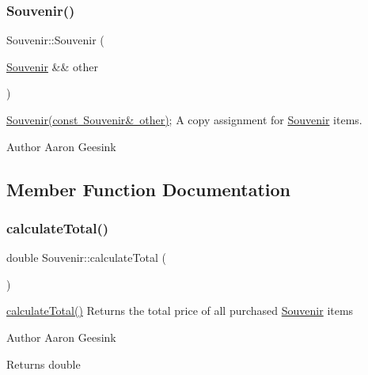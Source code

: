 \subsubsection{\texorpdfstring{Souvenir()}{Souvenir()}\hspace{0.1cm}{\footnotesize\ttfamily [4/4]}}
{\footnotesize\ttfamily Souvenir\+::\+Souvenir (\begin{DoxyParamCaption}\item[{\mbox{\hyperlink{class_souvenir}{Souvenir}} \&\&}]{other }\end{DoxyParamCaption})}



\mbox{\hyperlink{class_souvenir_a358e41f53d1806aa00b8b1f2f31f4e11}{Souvenir(const Souvenir\& other)}}; A copy assignment for \mbox{\hyperlink{class_souvenir}{Souvenir}} items. 

\begin{DoxyAuthor}{Author}
Aaron Geesink 
\end{DoxyAuthor}


\subsection{Member Function Documentation}
\mbox{\label{class_souvenir_a4ee8f8262e9020e6141c4d228450b03d}} 
\subsubsection{\texorpdfstring{calculateTotal()}{calculateTotal()}}
{\footnotesize\ttfamily double Souvenir\+::calculate\+Total (\begin{DoxyParamCaption}{ }\end{DoxyParamCaption})}



\mbox{\hyperlink{class_souvenir_a4ee8f8262e9020e6141c4d228450b03d}{calculate\+Total()}} Returns the total price of all purchased \mbox{\hyperlink{class_souvenir}{Souvenir}} items 

\begin{DoxyAuthor}{Author}
Aaron Geesink 
\end{DoxyAuthor}
\begin{DoxyReturn}{Returns}
double 
\end{DoxyReturn}
\mbox{\label{class_souvenir_acdfe838ebcf9839c888d872ca6a75782}} 
